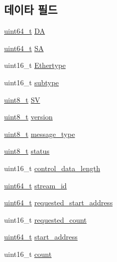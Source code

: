 \subsection*{데이타 필드}
\begin{DoxyCompactItemize}
\item 
\hyperlink{parse_8c_aec6fcb673ff035718c238c8c9d544c47}{uint64\+\_\+t} \hyperlink{structmaap__packet_acb85280d2eab3ae8bc045112037a565d}{DA}
\item 
\hyperlink{parse_8c_aec6fcb673ff035718c238c8c9d544c47}{uint64\+\_\+t} \hyperlink{structmaap__packet_a725bf85ec39adedda8b4adb109c29ded}{SA}
\item 
uint16\+\_\+t \hyperlink{structmaap__packet_a1a9102ebc02a8e42299ec477781088cd}{Ethertype}
\item 
uint16\+\_\+t \hyperlink{structmaap__packet_ac5d9ab8403fb9ca24facc32b821dd53b}{subtype}
\item 
\hyperlink{stdint_8h_aba7bc1797add20fe3efdf37ced1182c5}{uint8\+\_\+t} \hyperlink{structmaap__packet_a86f6b56adf7c3c38c254b7f71dce6a6c}{SV}
\item 
\hyperlink{stdint_8h_aba7bc1797add20fe3efdf37ced1182c5}{uint8\+\_\+t} \hyperlink{structmaap__packet_ab22abc2906422da61885ac6c8e6a1a59}{version}
\item 
\hyperlink{stdint_8h_aba7bc1797add20fe3efdf37ced1182c5}{uint8\+\_\+t} \hyperlink{structmaap__packet_aeaaffeace8c23899e558022f62ce6de4}{message\+\_\+type}
\item 
\hyperlink{stdint_8h_aba7bc1797add20fe3efdf37ced1182c5}{uint8\+\_\+t} \hyperlink{structmaap__packet_ade818037fd6c985038ff29656089758d}{status}
\item 
uint16\+\_\+t \hyperlink{structmaap__packet_acc7cd70455e6e455ac498477b95f9e21}{control\+\_\+data\+\_\+length}
\item 
\hyperlink{parse_8c_aec6fcb673ff035718c238c8c9d544c47}{uint64\+\_\+t} \hyperlink{structmaap__packet_af5af7b461263e29ceb91a8d3a8bc2c97}{stream\+\_\+id}
\item 
\hyperlink{parse_8c_aec6fcb673ff035718c238c8c9d544c47}{uint64\+\_\+t} \hyperlink{structmaap__packet_a6e54c2881571f11a3a4a82c664794326}{requested\+\_\+start\+\_\+address}
\item 
uint16\+\_\+t \hyperlink{structmaap__packet_a3b7ca808f59412368434591249aa8a79}{requested\+\_\+count}
\item 
\hyperlink{parse_8c_aec6fcb673ff035718c238c8c9d544c47}{uint64\+\_\+t} \hyperlink{structmaap__packet_a435fb25eb186ac591e661f3f1253de25}{start\+\_\+address}
\item 
uint16\+\_\+t \hyperlink{structmaap__packet_af6a39bfc7e1dc3b6f9c997c1c43fa996}{count}
\end{DoxyCompactItemize}


